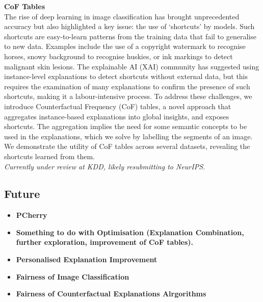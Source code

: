 \noindent
\textbf{CoF Tables}\\
The rise of deep learning in image classification has brought unprecedented accuracy but also highlighted a key issue: the use of `shortcuts' by models. Such shortcuts are easy-to-learn patterns from the training data that fail to generalise to new data. Examples include the use of a copyright watermark to recognise horses, snowy background to recognise huskies, or ink markings to detect malignant skin lesions. The explainable AI (XAI) community has suggested using instance-level explanations to detect shortcuts without external data, but this requires the examination of many explanations to confirm the presence of such shortcuts, making it a labour-intensive process. To address these challenges, we introduce Counterfactual Frequency (CoF) tables, a novel approach that aggregates instance-based explanations into global insights, and exposes shortcuts. The aggregation implies the need for some semantic concepts to be used in the explanations, which we solve by labelling the segments of an image. We demonstrate the utility of CoF tables across several datasets, revealing the shortcuts learned from them.\\
\textit{Currently under review at KDD, likely resubmitting to NeurIPS.}

\subsection{Future}


\begin{itemize}
    \item \textbf{PCherry}
    \item \textbf{Something to do with Optimisation (Explanation Combination, further exploration, improvement of CoF tables).}
    \item \textbf{Personalised Explanation Improvement}
    \item \textbf{Fairness of Image Classification}
    \item \textbf{Fairness of Counterfactual Explanations Alrgorithms}
\end{itemize}